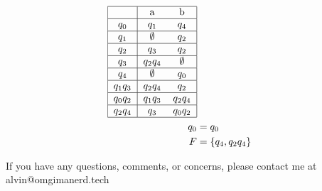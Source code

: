 \documentclass{math}
\begin{document}
\begin{enumerate}[(a)]
\begin{align*}
\begin{tabular}{|c|cc|}
      \hline
                   & a               & b               \\ \hline
      \( q_0    \) & \( q_1       \) & \( q_4       \) \\ \hline
      \( q_1    \) & \( \emptyset \) & \( q_2       \) \\ \hline
      \( q_2    \) & \( q_3       \) & \( q_2       \) \\ \hline
      \( q_3    \) & \( q_2q_4    \) & \( \emptyset \) \\ \hline
      \( q_4    \) & \( \emptyset \) & \( q_0       \) \\ \hline
      \( q_1q_3 \) & \( q_2q_4    \) & \( q_2       \) \\ \hline
      \( q_0q_2 \) & \( q_1q_3    \) & \( q_2q_4    \) \\ \hline
      \( q_2q_4 \) & \( q_3       \) & \( q_0q_2    \) \\ \hline
    \end{tabular} \\
    q_0 &= q_0 \\
    F &= \{q_4,q_2q_4\}
  \end{align*}
\end{enumerate}

\begin{center}
  If you have any questions, comments, or concerns, please contact me at
  alvin@omgimanerd.tech
\end{center}
\end{document}
